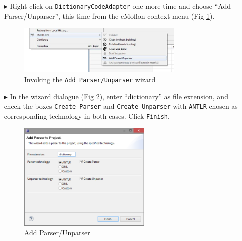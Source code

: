 \begin{enumerate}
\item[$\blacktriangleright$] Right-click on \texttt{DictionaryCodeAdapter} one more time and choose ``Add Parser/Unparser'', this time from the eMoflon context menu (Fig \ref{fig:moca-1-AddParserAndUnparserWizard}).

\begin{figure}[!htbp]
\begin{center}
 \includegraphics[width=0.75\textwidth]{pics/moca/2TextToMocaTree/1-AddParserAndUnparserWizard}
  \caption{Invoking the \texttt{Add Parser/Unparser} wizard} 
  \label{fig:moca-1-AddParserAndUnparserWizard}
\end{center}
\end{figure}
 
\item[$\blacktriangleright$] In the wizard dialogue (Fig \ref{fig:moca-2-AddParser}), enter ``dictionary'' as file extension, and check the boxes \texttt{Create Parser} and \texttt{Create Unparser} with \texttt{ANTLR} chosen as corresponding technology in both cases.  Click \texttt{Finish}. 

\begin{figure}[!htbp]
\begin{center}
 \includegraphics[width=0.6\textwidth]{pics/moca/2TextToMocaTree/2-AddParser.png}
  \caption{Add Parser/Unparser}
  \label{fig:moca-2-AddParser}
\end{center}
\end{figure}

\end{enumerate}

